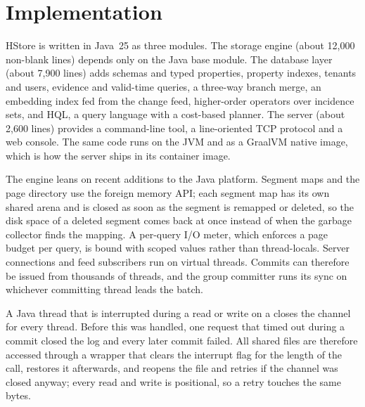 \section{Implementation}
\label{sec:implementation}

HStore is written in Java~25 as three modules. The storage engine (about 12,000 non-blank lines) depends only on the Java base module. The database layer (about 7,900 lines) adds schemas and typed properties, property indexes, tenants and users, evidence and valid-time queries, a three-way branch merge, an embedding index fed from the change feed, higher-order operators over incidence sets, and HQL, a query language with a cost-based planner. The server (about 2,600 lines) provides a command-line tool, a line-oriented TCP protocol and a web console. The same code runs on the JVM and as a GraalVM native image, which is how the server ships in its container image.

The engine leans on recent additions to the Java platform. Segment maps and the page directory use the foreign memory API; each segment map has its own shared arena and is closed as soon as the segment is remapped or deleted, so the disk space of a deleted segment comes back at once instead of when the garbage collector finds the mapping. A per-query I/O meter, which enforces a page budget per query, is bound with scoped values rather than thread-locals. Server connections and feed subscribers run on virtual threads. Commits can therefore be issued from thousands of threads, and the group committer runs its sync on whichever committing thread leads the batch.

A Java thread that is interrupted during a read or write on a  closes the channel for every thread. Before this was handled, one request that timed out during a commit closed the log and every later commit failed. All shared files are therefore accessed through a wrapper that clears the interrupt flag for the length of the call, restores it afterwards, and reopens the file and retries if the channel was closed anyway; every read and write is positional, so a retry touches the same bytes.

